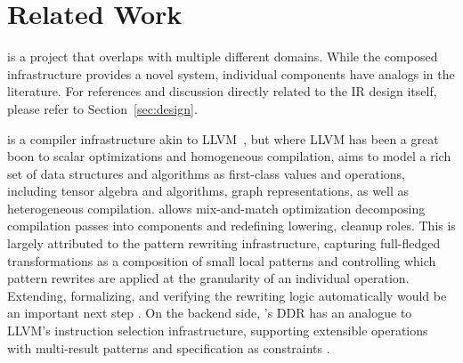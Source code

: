 \section{Related Work}

\MLIR is a project that overlaps with multiple different domains. While the
composed infrastructure provides a novel system, individual components have analogs in the literature. For references and discussion directly related to the IR design itself, please refer to Section~\ref{sec:design}.

\MLIR is a compiler infrastructure akin to
LLVM~\cite{LLVM:CGO04}, but where LLVM has been a great boon to scalar
optimizations and homogeneous compilation, \MLIR aims to model a rich set of data structures and algorithms as first-class values and operations, including tensor algebra and algorithms, graph representations, as well as heterogeneous compilation.
\MLIR allows mix-and-match optimization decomposing compilation passes into components and redefining lowering, cleanup roles. This is largely attributed to the pattern rewriting infrastructure, capturing full-fledged transformations as a composition of small local patterns and controlling which pattern rewrites are applied at the granularity of an individual operation. Extending, formalizing, and verifying the rewriting logic automatically would be an important next step \cite{DBLP:journals/scp/BravenboerKVV08,Meseguer:2010:TYR:1927806.1927809}.
On the backend side, \MLIR's DDR has an analogue to LLVM's instruction selection infrastructure, supporting extensible operations with multi-result patterns and specification as constraints \cite{Thier:2018:FFI:3178372.3179501}.

